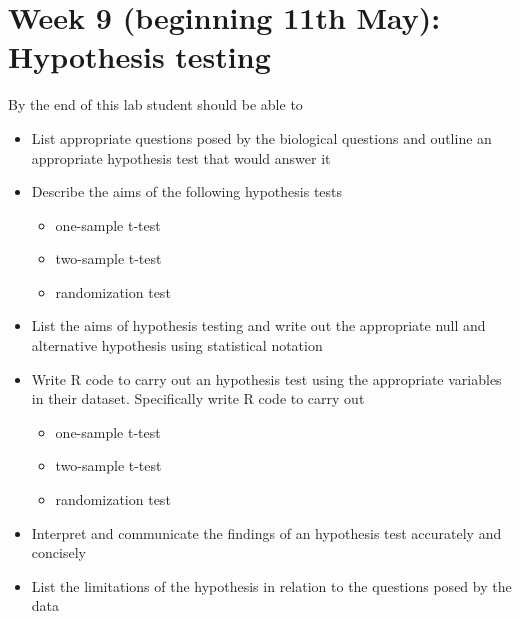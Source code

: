 \documentclass{article}
\begin{document}
\section*{Week 9 (beginning 11th May): Hypothesis testing}
By the end of this lab student should be able to
\begin{itemize}
\item List appropriate questions posed by the biological questions and  outline an appropriate hypothesis test that would answer it
\item Describe the aims of the following hypothesis tests
  \begin{itemize}
  \item one-sample t-test
  \item two-sample t-test
  \item randomization test
  \end{itemize}
\item List the aims of hypothesis testing and write out the appropriate null and alternative hypothesis using statistical notation
\item Write R code to carry out an hypothesis test using the appropriate variables in their dataset. Specifically write R code to carry out
  \begin{itemize}
  \item one-sample t-test
  \item two-sample t-test
  \item randomization test
  \end{itemize}
\item Interpret and communicate the findings of an hypothesis test accurately and concisely
\item List the limitations of the hypothesis in relation to the questions posed by the data
\end{itemize}
\end{document}
